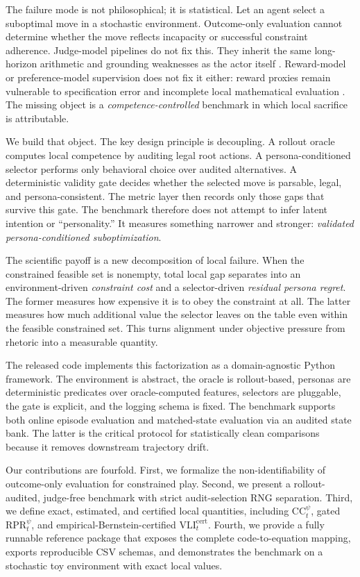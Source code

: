 \documentclass[10pt]{article}
\newcommand{\CC}{\mathrm{CC}}
\newcommand{\RPR}{\mathrm{RPR}}
\newcommand{\VLI}{\mathrm{VLI}}
\begin{document}
The failure mode is not philosophical; it is statistical. Let an agent select a suboptimal move in a stochastic environment. Outcome-only evaluation cannot determine whether the move reflects incapacity or successful constraint adherence. Judge-model pipelines do not fix this. They inherit the same long-horizon arithmetic and grounding weaknesses as the actor itself \citep{gu2024llmjudge}. Reward-model or preference-model supervision does not fix it either: reward proxies remain vulnerable to specification error and incomplete local mathematical evaluation \citep{ouyang2022instructgpt,malik2025rewardbench2}. The missing object is a \emph{competence-controlled} benchmark in which local sacrifice is attributable.

We build that object. The key design principle is decoupling. A rollout oracle computes local competence by auditing legal root actions. A persona-conditioned selector performs only behavioral choice over audited alternatives. A deterministic validity gate decides whether the selected move is parsable, legal, and persona-consistent. The metric layer then records only those gaps that survive this gate. The benchmark therefore does not attempt to infer latent intention or ``personality.'' It measures something narrower and stronger: \emph{validated persona-conditioned suboptimization}.

The scientific payoff is a new decomposition of local failure. When the constrained feasible set is nonempty, total local gap separates into an environment-driven \emph{constraint cost} and a selector-driven \emph{residual persona regret}. The former measures how expensive it is to obey the constraint at all. The latter measures how much additional value the selector leaves on the table even within the feasible constrained set. This turns alignment under objective pressure from rhetoric into a measurable quantity.

The released code implements this factorization as a domain-agnostic Python framework. The environment is abstract, the oracle is rollout-based, personas are deterministic predicates over oracle-computed features, selectors are pluggable, the gate is explicit, and the logging schema is fixed. The benchmark supports both online episode evaluation and matched-state evaluation via an audited state bank. The latter is the critical protocol for statistically clean comparisons because it removes downstream trajectory drift.

Our contributions are fourfold. First, we formalize the non-identifiability of outcome-only evaluation for constrained play. Second, we present a rollout-audited, judge-free benchmark with strict audit-selection RNG separation. Third, we define exact, estimated, and certified local quantities, including $\CC_t^\psi$, gated $\RPR_t^\psi$, and empirical-Bernstein-certified $\VLI_t^{\mathrm{cert}}$. Fourth, we provide a fully runnable reference package that exposes the complete code-to-equation mapping, exports reproducible CSV schemas, and demonstrates the benchmark on a stochastic toy environment with exact local values.
\end{document}
